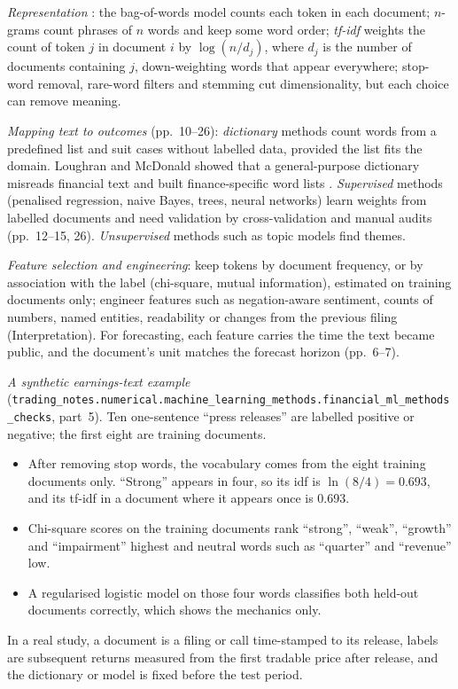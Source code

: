 \begin{qfmethod}\label{meth:text-feature-engineering}
 \emph{Representation} \citep[NBER WP 23276, pp.~5--8]{wide-gentzkow-kelly-taddy}: the bag-of-words model counts each token in each document; $n$-grams count phrases of $n$ words and keep some word order; \emph{tf-idf} weights the count of token $j$ in document $i$ by $\log(n/d_j)$, where $d_j$ is the number of documents containing $j$, down-weighting words that appear everywhere; stop-word removal, rare-word filters and stemming cut dimensionality, but each choice can remove meaning.

\emph{Mapping text to outcomes} (pp.~10--26): \emph{dictionary} methods count words from a predefined list and suit cases without labelled data, provided the list fits the domain. Loughran and McDonald showed that a general-purpose dictionary misreads financial text and built finance-specific word lists \citep[p.~31]{wide-gentzkow-kelly-taddy}. \emph{Supervised} methods (penalised regression, naive Bayes, trees, neural networks) learn weights from labelled documents and need validation by cross-validation and manual audits (pp.~12--15, 26). \emph{Unsupervised} methods such as topic models find themes.

\emph{Feature selection and engineering}: keep tokens by document frequency, or by association with the label (chi-square, mutual information), estimated on training documents only; engineer features such as negation-aware sentiment, counts of numbers, named entities, readability or changes from the previous filing (Interpretation). For forecasting, each feature carries the time the text became public, and the document's unit matches the forecast horizon (pp.~6--7).

 \emph{A synthetic earnings-text example} (\nolinkurl{trading_notes.numerical.machine_learning_methods.financial_ml_methods_checks}, part~5). Ten one-sentence ``press releases'' are labelled positive or negative; the first eight are training documents.
\begin{itemize}
\item After removing stop words, the vocabulary comes from the eight training documents only. ``Strong'' appears in four, so its idf is $\ln(8/4)=0.693$, and its tf-idf in a document where it appears once is 0.693.
\item Chi-square scores on the training documents rank ``strong'', ``weak'', ``growth'' and ``impairment'' highest and neutral words such as ``quarter'' and ``revenue'' low.
\item A regularised logistic model on those four words classifies both held-out documents correctly, which shows the mechanics only.
\end{itemize}
In a real study, a document is a filing or call time-stamped to its release, labels are subsequent returns measured from the first tradable price after release, and the dictionary or model is fixed before the test period.


\end{qfmethod}
